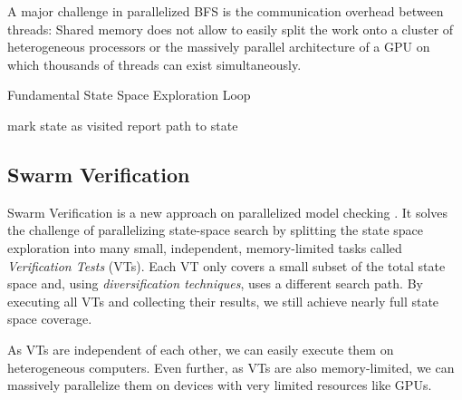 \documentclass[
fancyheadings, %
%
%
]{stsreprt}
\begin{document}
A major challenge in parallelized BFS is the communication overhead between threads:
Shared memory does not allow to easily split the work onto a cluster of heterogeneous processors or the massively parallel architecture of a GPU on which thousands of threads can exist simultaneously.

\begin{algorithm}
    \caption{Fundamental State Space Exploration Loop}
    \label{alg:fundamental-state-space-exploration}
    \begin{algorithmic}
        \State mark state as visited
        \State report path to state
        \EndIf
        \EndWhile
    \end{algorithmic}
\end{algorithm}

\subsection{Swarm Verification}
\label{section:background:swarm-verification}

Swarm Verification is a new approach on parallelized model checking \cite{Holzmann2008.Swarm-Verification}.
It solves the challenge of parallelizing state-space search by splitting the state space exploration into many small, independent, memory-limited tasks called \emph{Verification Tests} (VTs).
Each VT only covers a small subset of the total state space and, using \emph{diversification techniques}, uses a different search path.
By executing all VTs and collecting their results, we still achieve nearly full state space coverage.


As VTs are independent of each other, we can easily execute them on heterogeneous computers.
Even further, as VTs are also memory-limited, we can massively parallelize them on devices with very limited resources like GPUs.
\end{document}
